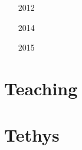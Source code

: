 \begin{small}
\begin{itemize}
\item[2012]
\item[2014]
\item[2015]
\end{itemize}
\end{small}

\section{Teaching} 

\begin{small}
\begin{itemize}
\item[\twothousandeleven]
\item[\twothousandfourteen]
\item[\twothousandnineteen] 
\item[\twothousandtwentyone] 
\end{itemize}
\end{small}

\section{Tethys} 

\begin{small}
\begin{itemize}
\item[\nineteenninetynine] 
\item[\twothousand] 
\item[\twothousandeleven] 
\item[\twothousandthirteen]
\item[\twothousandsixteen] 
\item[\twothousandeighteen] 
\item[\twothousandtwentyone] 
\item[\twothousandtwentytwo] 
 \\
 \\
\item[\twothousandtwentythree]
\end{itemize}
\end{small}

